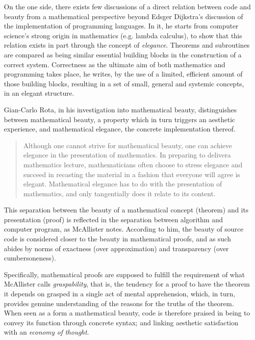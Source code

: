 On the one side, there exists few discussions of a direct relation between code and beauty from a mathematical perspective beyond Edsger Dijkstra's discussion of the implementation of programming languages. In it, he starts from computer science's strong origin in mathematics (e.g. lambda calculus), to show that this relation exists in part through the concept of \emph{elegance}. Theorems and subroutines are compared as being similar essential building blocks in the construction of a correct system. Correctness as the ultimate aim of both mathematics and programming takes place, he writes, by the use of a limited, efficient amount of those building blocks, resulting in a set of small, general and systemic concepts, in an elegant structure\cite{dijkstra_design_1963}.

Gian-Carlo Rota, in his investigation into mathematical beauty, distinguishes between mathematical beauty, a property which in turn triggers an aesthetic experience, and mathematical elegance, the concrete implementation thereof.

\begin{quote}
  Although one cannot strive for mathematical beauty, one can achieve elegance in the presentation of mathematics. In preparing to delivera mathematics lecture, mathematicians often choose to stress elegance and succeed in recasting the material in a fashion that everyone will agree is elegant. Mathematical elegance has to do with the presentation of mathematics, and only tangentially does it relate to its content.\cite{rota_phenomenology_1997}
\end{quote}

This separation between the beauty of a mathematical concept (theorem) and its presentation (proof) is reflected in the separation between algorithm and computer program, as McAllister notes. According to him, the beauty of source code is considered closer to the beauty in mathematical proofs, and as such abides by norms of exactness (over approximation) and transparency (over cumbersoneness)\cite{mcallister_mathematical_2005}.

Specifically, mathematical proofs are supposed to fulfill the requirement of what McAllister calls \emph{graspability}, that is, the tendency for a proof to have the theorem it depends on grasped in a single act of mental apprehension, which, in turn, provides genuine understanding of the reasons for the truths of the theorem. When seen as a form a mathematical beauty, code is therefore praised in being to convey its function through concrete syntax; and linking aesthetic satisfaction with an \emph{economy of thought}.

